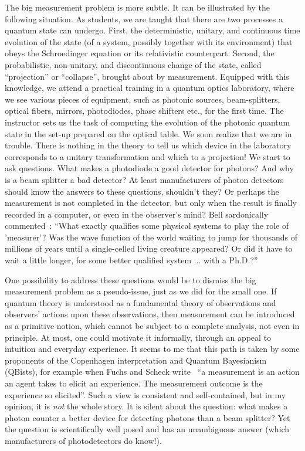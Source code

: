 \documentclass[12pt]{article}
\begin{document}
The big measurement problem is more subtle. It can be illustrated by the following situation. As students, we are taught that there are two processes a quantum state can undergo. First, the deterministic, unitary, and continuous time evolution of the state (of a system, possibly together with its environment) that obeys the Schroedinger equation or its relativistic counterpart. Second, the probabilistic, non-unitary, and discontinuous change of the state, called ``projection'' or ``collapse'', brought about by measurement. Equipped with this knowledge, we attend a practical training in a quantum optics laboratory, where we see various pieces of equipment, such as photonic sources, beam-splitters, optical fibers, mirrors, photodiodes, phase shifters etc., for the first time. The instructor sets us the task of computing the evolution of the photonic quantum state in the set-up prepared on the optical table. We soon realize that we are in trouble. There is nothing in the theory to tell us which device in the laboratory corresponds to a unitary transformation and which to a projection! We start to ask questions. What makes a photodiode a good detector for photons? And why is a beam splitter a bad detector? At least manufacturers of photon detectors should know the answers to these questions, shouldn't they? Or perhaps the measurement is not completed in the detector, but only when the result is finally recorded in a computer, or even in the observer's mind? Bell sardonically commented~\cite{bell}: ``What exactly qualifies some physical systems to play the role of 'measurer'? Was the wave function of the world waiting to jump for thousands of millions of years until a single-celled living creature appeared? Or did it have to wait a little longer, for some better qualified system ... with a Ph.D.?'' 

One possibility to address these questions would be to dismiss the big measurement problem as a pseudo-issue, just as we did for the small one. If quantum theory is understood as a fundamental theory of observations and observers' actions upon these observations, then measurement can be introduced as a primitive notion, which cannot be subject to a complete  analysis, not even in principle. At most, one could motivate it informally, through an appeal to intuition and everyday experience. It seems to me that this path is taken by some proponents of the Copenhagen interpretation and Quantum Bayesianism (QBists), for example when Fuchs and Scheck write~\cite{fuchs} ``a measurement is an action an agent takes to elicit an experience. The measurement outcome is the experience so elicited''. Such a view is consistent and self-contained, but in my opinion, it is {\it not} the whole story. It is silent about the question: what makes a photon counter a better device for detecting photons than a beam splitter? Yet the question is scientifically well posed and has an unambiguous answer (which manufacturers of photodetectors do know!).  
\end{document}
